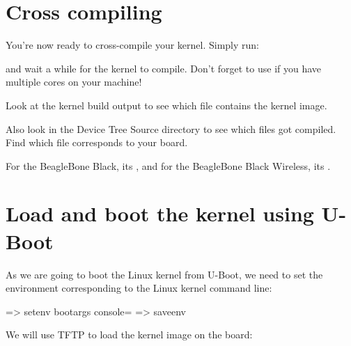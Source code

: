

\section{Cross compiling}

You're now ready to cross-compile your kernel. Simply run:


and wait a while for the kernel to compile. Don't forget to use
 if you have multiple cores on your machine!

Look at the kernel build output to see which file contains
the kernel image.

Also look in the Device Tree Source directory to see which 
files got compiled. Find which  file corresponds to your board.

{For the BeagleBone Black, its ,
and for the BeagleBone Black Wireless, its
.}
{}

\section{Load and boot the kernel using U-Boot}

As we are going to boot the Linux kernel from U-Boot,
we need to set the  environment corresponding
to the Linux kernel command line:

\begin{ubootinput}
=> setenv bootargs console=%
=> saveenv
\end{ubootinput}
We will use TFTP to load the kernel image on the board:

